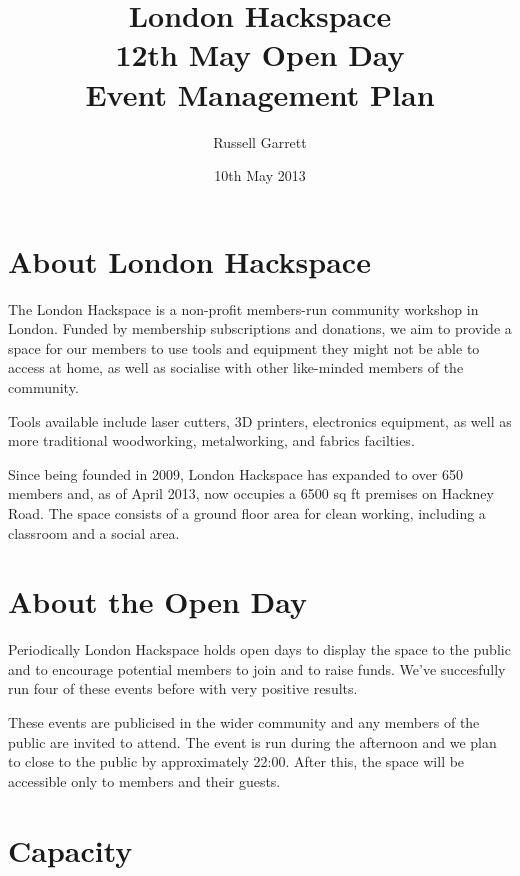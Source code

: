 \title{London Hackspace\\
    12th May Open Day\\
    Event Management Plan
}


\date{10th May 2013}

\author{Russell Garrett}

\maketitle

\section{About London Hackspace}

The London Hackspace is a non-profit members-run community workshop in London.
Funded by membership subscriptions and donations, we aim to provide a space for
our members to use tools and equipment they might not be able to access at
home, as well as socialise with other like-minded members of the community.

Tools available include laser cutters, 3D printers, electronics equipment,
as well as more traditional woodworking, metalworking, and fabrics facilties.

Since being founded in 2009, London Hackspace has expanded to over 650 members
and, as of April 2013, now occupies a 6500 sq ft premises on Hackney Road.
The space consists of a ground floor area for clean working, including a
classroom and a social area.

\section{About the Open Day}

Periodically London Hackspace holds open days to display the space to the public
and to encourage potential members to join and to raise funds. We've succesfully
run four of these events before with very positive results.

These events are publicised in the wider community and any members of the public are
invited to attend. The event is run during the afternoon and we plan to close to
the public by approximately 22:00. After this, the space will be accessible only
to members and their guests.

\section{Capacity}

